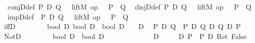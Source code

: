 \begin{isabellebody}
\ \ conjD{\isacharunderscore}def{\isacharcolon}\ {\isachardoublequote}P\ {\isasymand}\isactrlsub D\ Q\ {\isasymequiv}\ {\isasymUp}\ {\isacharparenleft}liftM{}\ {\isacharparenleft}op\ {\isasymand}{\isacharparenright}\ {\isacharparenleft}{\isasymDown}\ P{\isacharparenright}\ {\isacharparenleft}{\isasymDown}\ Q{\isacharparenright}{\isacharparenright}{\isachardoublequote}\isanewline
\ \ disjD{\isacharunderscore}def{\isacharcolon}\ {\isachardoublequote}P\ {\isasymor}\isactrlsub D\ Q\ {\isasymequiv}\ {\isasymUp}\ {\isacharparenleft}liftM{}\ {\isacharparenleft}op\ {\isasymor}{\isacharparenright}\ {\isacharparenleft}{\isasymDown}\ P{\isacharparenright}\ {\isacharparenleft}{\isasymDown}\ Q{\isacharparenright}{\isacharparenright}{\isachardoublequote}\isanewline
\ \ impD{\isacharunderscore}def{\isacharcolon}\ \ {\isachardoublequote}P\ {\isasymlongrightarrow}\isactrlsub D\ Q\ {\isasymequiv}\ {\isasymUp}\ {\isacharparenleft}liftM{}\ {\isacharparenleft}op\ {\isasymlongrightarrow}{\isacharparenright}\ {\isacharparenleft}{\isasymDown}\ P{\isacharparenright}\ {\isacharparenleft}{\isasymDown}\ Q{\isacharparenright}{\isacharparenright}{\isachardoublequote}\isanewline
\isanewline
\isanewline
\isamarkupfalse%
\isanewline
\ iffD\ \ \ \ \ \ \ \ {\isacharcolon}{\isacharcolon}\ {\isachardoublequote}{\isacharbrackleft}bool\ D{\isacharcomma}\ bool\ D{\isacharbrackright}\ {\isasymRightarrow}\ bool\ D{\isachardoublequote}\ \ \ {\isacharparenleft}\ {\isachardoublequote}{\isasymlongleftrightarrow}\isactrlsub D{\isachardoublequote}\ {}{}{\isacharparenright}\isanewline
\ {\isachardoublequote}P\ {\isasymlongleftrightarrow}\isactrlsub D\ Q\ {\isasymequiv}\ {\isacharparenleft}P\ {\isasymlongrightarrow}\isactrlsub D\ Q{\isacharparenright}\ {\isasymand}\isactrlsub D\ {\isacharparenleft}Q\ {\isasymlongrightarrow}\isactrlsub D\ P{\isacharparenright}{\isachardoublequote}\isanewline
\ NotD\ \ \ \ \ \ \ \ {\isacharcolon}{\isacharcolon}\ {\isachardoublequote}bool\ D\ {\isasymRightarrow}\ bool\ D{\isachardoublequote}\ \ \ \ \ \ \ \ \ \ \ \ \ \ {\isacharparenleft}{\isachardoublequote}{\isasymnot}\isactrlsub D\ {\isacharunderscore}{\isachardoublequote}\ {\isacharbrackleft}{}{}{\isacharbrackright}\ {}{}{\isacharparenright}\isanewline
\ \ {\isachardoublequote}{\isasymnot}\isactrlsub D\ P\ {\isasymequiv}\ P\ {\isasymlongrightarrow}\isactrlsub D\ Ret\ False{\isachardoublequote}\isamarkupfalse%
%
\begin{isamarkuptext}%

\end{isamarkuptext}
\end{isabellebody}
